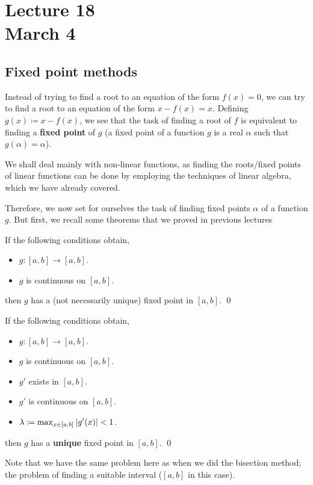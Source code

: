 \chapter*{Lecture 18 \\ March 4}
\setcounter{chapter}{18}
\setcounter{section}{0}

\section{Fixed point methods}

Instead of trying to find a root to an equation of the form $f(x) = 0$, we can try to find a root to an equation of the form $x - f(x) = x$. Defining $g(x) \coloneqq x - f(x)$, we see that the task of finding a root of $f$ is equivalent to finding a \textbf{fixed point} of $g$ (a fixed point of a function $g$ is a real $\alpha$ such that $g(\alpha) = \alpha$).

We shall deal mainly with non-linear functions, as finding the roots/fixed points of linear functions can be done by employing the techniques of linear algebra, which we have already covered.

Therefore, we now set for ourselves the task of finding fixed points $\alpha$ of a function $g$. But first, we recall some theorems that we proved in previous lectures

\begin{thm}
  \hfill
  
  If the following conditions obtain,
  \begin{itemize}
  \item
    $g \colon [a, b] \to [a, b]$.
    
  \item
    $g$ is continuous on $[a, b]$.
    
  \end{itemize}
  then $g$ has a (not necessarily unique) fixed point in $[a, b]$.
  \hfill\qed
\end{thm}

\begin{thm}
  \hfill
  
  If the following conditions obtain,
  \begin{itemize}
  \item
    $g \colon [a, b] \to [a, b]$.

  \item
    $g$ is continuous on $[a, b]$.

    \item
    $g'$ exists in $[a, b]$.

  \item
    $g'$ is continuous on $[a, b]$.

  \item
    $\lambda \coloneqq \max_{x \in [a, b]} \abs{g'(x)} < 1$.

  \end{itemize}
  then $g$ has a \textbf{unique} fixed point in $[a, b]$.
  \hfill\qed
\end{thm}
Note that we have the same problem here as when we did the bisection method; the problem of finding a suitable interval ($[a, b]$ in this case).

